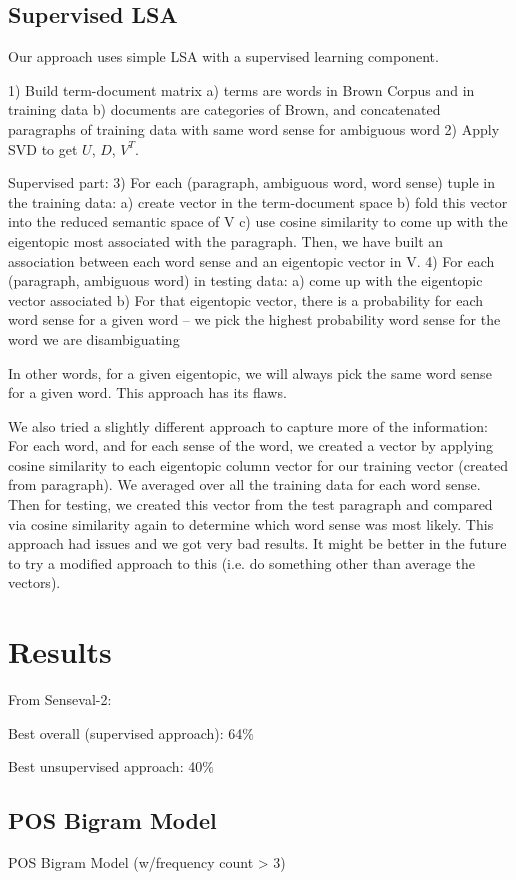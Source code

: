 \documentclass[10pt, letterpaper]{article}
\begin{document}
	\subsection{Supervised LSA}
	Our approach uses simple LSA with a supervised learning component. 

	1) Build term-document matrix 
		a) terms are words in Brown Corpus and in training data
		b) documents are categories of Brown, and concatenated paragraphs of training data with same word sense for ambiguous word
	2) Apply SVD to get $U$, $D$, $V^T$.

	Supervised part: 
	3) For each (paragraph, ambiguous word, word sense) tuple in the training data:
		a) create vector in the term-document space
		b) fold this vector into the reduced semantic space of V
		c) use cosine similarity to come up with the eigentopic most associated with the paragraph. 
	Then, we have built an association between each word sense and an eigentopic vector in V. 
	4) For each (paragraph, ambiguous word) in testing data:
		a) come up with the eigentopic vector associated
		b) For that eigentopic vector, there is a probability for each word sense for a given word -- we pick the highest probability word sense for the word we are disambiguating

	In other words, for a given eigentopic, we will always pick the same word sense for a given word. This approach has its flaws.

	We also tried a slightly different approach to capture more of the information: For each word, and for each sense of the word, we created a vector by applying cosine similarity to each eigentopic column vector for our training vector (created from paragraph). We averaged over all the training data for each word sense. Then for testing, we created this vector from the test paragraph and compared via cosine similarity again to determine which word sense was most likely. 
	This approach had issues and we got very bad results. 
	It might be better in the future to try a modified approach to this (i.e. do something other than average the vectors).

	\section{Results}
	From Senseval-2:

	Best overall (supervised approach): 64$\%$	

	Best unsupervised approach: 40$\%$

	\subsection{POS Bigram Model}
	POS Bigram Model (w/frequency count > 3)
\end{document}
